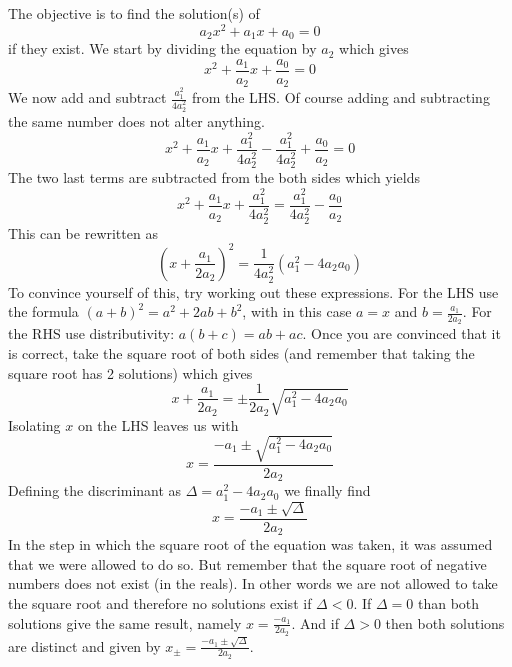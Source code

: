 \noindent The objective is to find the solution(s) of
\begin{equation*}
a_2 x^2 + a_1 x + a_0 = 0
\end{equation*}
if they exist. We start by dividing the equation by $a_2$ which gives
\begin{equation*}
x^2 + \frac{a_1}{a_2} x + \frac{a_0}{a_2} = 0
\end{equation*}
We now add and subtract $\frac{a_1^2}{4 a_2^2}$ from the LHS. Of course adding and subtracting the same number does not alter anything.
\begin{equation*}
x^2 + \frac{a_1}{a_2} x + \frac{a_1^2}{4 a_2^2} - \frac{a_1^2}{4 a_2^2} + \frac{a_0}{a_2} = 0
\end{equation*}
The two last terms are subtracted from the both sides which yields
\begin{equation*}
x^2 + \frac{a_1}{a_2} x + \frac{a_1^2}{4 a_2^2} = \frac{a_1^2}{4 a_2^2} - \frac{a_0}{a_2}
\end{equation*}
This can be rewritten as
\begin{equation*}
\left( x + \frac{a_1}{2a_2} \right)^2 = \frac{1}{4a_2^2} \left( a_1^2 - 4 a_2 a_0 \right)
\end{equation*}
\noindent To convince yourself of this, try working out these expressions. For the LHS use the formula $(a+b)^2 = a^2 + 2ab + b^2$, with in this case $a=x$ and $b = \frac{a_1}{2a_2}$. For the RHS use distributivity: $a (b+c) = ab + ac$. Once you are convinced that it is correct, take the square root of both sides (and remember that taking the square root has 2 solutions) which gives
\begin{equation*}
x + \frac{a_1}{2a_2}  = \pm \frac{1}{2a_2} \sqrt{ a_1^2 - 4 a_2 a_0 }
\end{equation*}
Isolating $x$ on the LHS leaves us with
\begin{equation*}
x =   \frac{-a_1  \pm \sqrt{ a_1^2 - 4 a_2 a_0 }}{2a_2}
\end{equation*}
Defining the discriminant as $\Delta = a_1^2 - 4 a_2 a_0$ we finally find
\begin{equation*}
x =   \frac{-a_1  \pm \sqrt{ \Delta }}{2a_2}
\end{equation*}
In the step in which the square root of the equation was taken, it was assumed that we were allowed to do so. But remember that the square root of negative numbers does not exist (in the reals). In other words we are not allowed to take the square root and therefore no solutions exist if $\Delta < 0$. If $\Delta = 0$ than both solutions give the same result, namely $x = \frac{-a_1}{2 a_2}$. And if $\Delta > 0$ then both solutions are distinct and given by $x_{\pm} = \frac{-a_1 \pm \sqrt{\Delta}}{2a_2}$.


